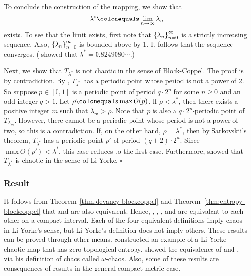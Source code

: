 \documentclass[12pt,twoside,draft]{book}
\begin{document}
\begin{example}
To conclude the construction of the mapping, we show that
\begin{equation*}
  \lambda^* \ceq \lim\limits_{n \to \infty} \lambda_n
\end{equation*}
exists.
To see that the limit exists, first note that $\left \{ \lambda_n \right \}^{\infty}_{n = 0}$ is a strictly increasing sequence.
Also, $\left \{ \lambda_n \right \}^{\infty}_{n = 0}$ is bounded above by 1.
It follows that the sequence converges.
(\citet{misiurewicz1} showed that $\lambda^* = 0.8249080 \cdots$.)

Next, we show that $T_{\lambda^*}$ is not chaotic in the sense of Block-Coppel.
The proof is by contradiction.
By \citet[II, Theorem 14]{blockcoppel}, $T_{\lambda^*}$ has a periodic point whose period is not a power of 2.
So suppose $p \in [0,1]$ is a periodic point of period $q\cdot 2^n$ for some $n \geq 0$ and an odd integer $q > 1$.
Let $\rho \ceq \max O(p)$.
If $\rho < \lambda^*$, then there exists a positive integer $m$ such that $\lambda_m > \rho$.
Note that $p$ is also a $q\cdot 2^n$-periodic point of $T_{\lambda_m}$.
However, there cannot be a periodic point whose period is not a power of two, so this is a contradiction.
If, on the other hand, $\rho = \lambda^*$, then by Sarkovskii's theorem, $T_{\lambda^*}$ has a periodic point $p'$ of period $(q+2)\cdot 2^n$.
Since $\max O(p') < \lambda^*$, this case reduces to the first case.
Furthermore, \citet[p.146]{blockcoppel} showed that $T_{\lambda^*}$ is chaotic in the sense of Li-Yorke. $\square$
\label{eg:counterexample}
\end{example}

\subsubsection*{Result}
It follows from Theorem~\ref{thm:devaney-blockcoppel} and Theorem~\ref{thm:entropy-blockcoppel} that \dev and \pte are also equivalent.
Hence, \dev, \wig, \blcp, and \pte are equivalent to each other on a compact interval.
Each of the four equivalent definitions imply chaos in Li-Yorke's sense, but Li-Yorke's definition does not imply others.
These results can be proved through other means.
\citet{smital} constructed an example of a Li-Yorke chaotic map that has zero topological entropy.
\citet{omegachaos} showed the equivalence of \dev and \pte, via his definition of chaos called $\omega$-chaos.
Also, some of these results are consequences of results in the general compact metric case.
\end{document}
